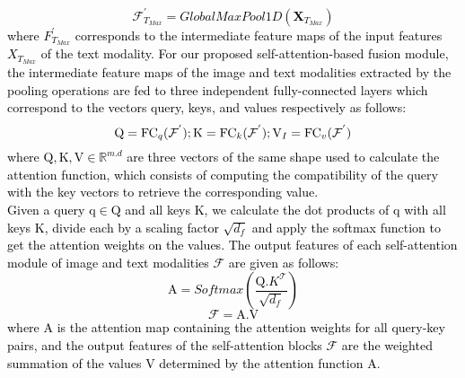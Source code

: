 \documentclass[twocolumn]{svjour3}
\begin{document}
\textcolor{black}{
\begin{equation}
    \mathcal{F}^{'}_{{T}_{Max}} = GlobalMaxPool1D (\mathbf{X}_{{T}_{Max}})
    \label{eq:equation2}
\end{equation}
}
\textcolor{black}{
where ${F}^{'}_{{T}_{Max}}$ corresponds to the intermediate feature maps of the input features ${X}_{{T}_{Max}}$ of the text modality.
For our proposed self-attention-based fusion module, the intermediate feature maps of the image and text modalities extracted by the pooling operations are fed to three independent fully-connected layers which correspond to the vectors query, keys, and values respectively as follows:
\begin{equation}
\mathrm{Q} = 
\mathrm{FC}_{q}(\mathcal{F}^{'}); \\
\mathrm{K} = \mathrm{FC}_{k}(\mathcal{F}^{'}); \\ 
\mathrm{V}_{I} = 
\mathrm{FC}_{v}(\mathcal{F}^{'})
\label{eq:equation3}
\end{equation}
where $\mathrm{Q}, \mathrm{K}, \mathrm{V} \in \mathbb{R}^{{m}.{d}}$ are three vectors of the same shape used to calculate the attention function, which consists of computing the compatibility of the query with the key vectors to retrieve the corresponding value. \\
Given a query $\mathrm{q} \in \mathrm{Q}$ and all keys $\mathrm{K}$, we calculate the dot products of $\mathrm{q}$ with all keys $\mathrm{K}$, divide each by a scaling factor $\sqrt{{d}_{f}}$ and apply the softmax function to get the attention weights on the values. The output features of each self-attention module of image and text modalities $\mathcal{F}$ are given as follows:\\
\begin{equation}
\mathrm{A} = Softmax(\frac{\mathrm{Q}.{K}^{\mathcal{T}}}{\sqrt{{d}_{f}}})
\label{eq:equation5}
\end{equation}
\begin{equation}
\mathcal{F} = \mathrm{A}.\mathrm{V}
\label{eq:equation6}
\end{equation}
where $\mathrm{A}$ is the attention map containing the attention weights for all query-key pairs, and the output features of the self-attention blocks $\mathcal{F}$ are the weighted summation of the values $\mathrm{V}$ determined by the attention function $\mathrm{A}$.}
\end{document}
